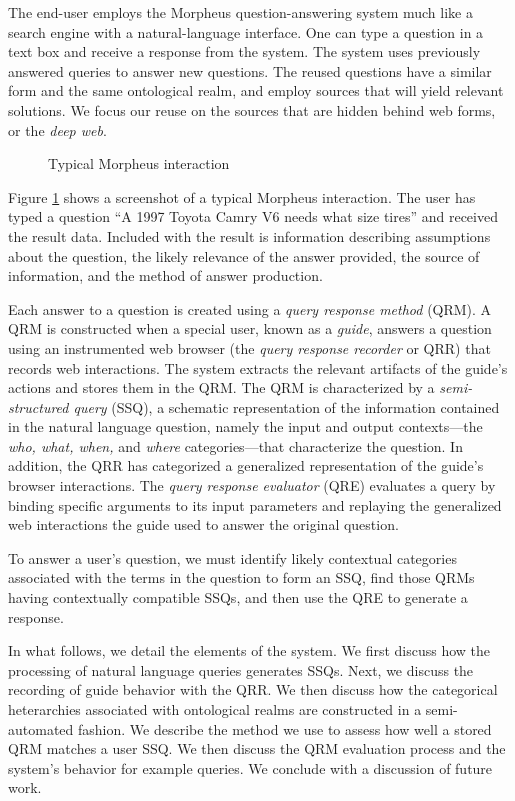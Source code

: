 
The end-user employs the Morpheus question-answering system much like a search engine with a natural-language interface. One can type a question in a text box and receive a response from the system. The system uses previously answered queries to answer new questions.  The reused questions have a similar form and the same ontological realm, and employ sources that will yield relevant solutions.  We focus our reuse on the sources that are hidden behind web forms, or the \emph{deep web}.

\begin{figure}
\caption{Typical Morpheus interaction}
\label{fig:screenshot}
\end{figure}

Figure \ref{fig:screenshot} shows a screenshot of a typical Morpheus
interaction. The user has typed a question ``A 1997 Toyota Camry V6 needs what size tires'' and
received the result data.  Included with the result is information describing assumptions about the question, the likely relevance of the answer provided,
the source of information, and the method of answer production.

Each answer to a question is created using a \emph{query response
  method} (QRM). A QRM is constructed when a special user, known as a
\emph{guide}, answers a question using an instrumented web browser (the
\emph{query response recorder} or QRR) that records web
interactions. The system extracts the relevant artifacts of the
guide's actions and stores them in the QRM. The QRM is characterized
by a \emph{semi-structured query} (SSQ), a schematic representation of
the information contained in the natural language question, namely the input and output
contexts---the \emph{who, what, when,} and \emph{where}
categories---that characterize the question.  In addition, the QRR has categorized a generalized representation of the guide's browser
interactions.  The \emph{query response evaluator} (QRE) evaluates a
query by binding specific arguments to its input parameters and
replaying the generalized web interactions the guide used to answer
the original question.

To answer a user's question, we must identify likely contextual
categories associated with the terms in the question to form an SSQ,
find those QRMs having contextually compatible SSQs, and then use the QRE to
generate a response.


In what follows, we detail the elements of the system.  We first
discuss how the processing of natural language queries generates SSQs.
Next, we discuss the recording of guide behavior with the QRR.  We
then discuss how the categorical heterarchies associated with
ontological realms are constructed in a semi-automated fashion.  We
describe the method we use to assess how well a stored QRM matches a
user SSQ.  We then discuss the QRM evaluation process and the
system's behavior for example queries. We conclude with a discussion of
future work.
 

